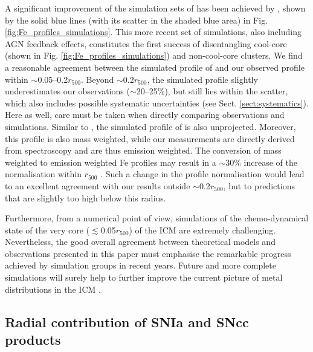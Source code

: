 \documentclass{aa}
\begin{document}
A significant improvement of the simulation sets of \citet[][]{2014MNRAS.438..195P} has been achieved by \citet[][]{2015ApJ...813L..17R}, shown by the solid blue lines (with its scatter in the shaded blue area) in Fig. \ref{fig:Fe_profiles_simulations}. This more recent set of simulations, also including AGN feedback effects, constitutes the first success of disentangling cool-core (shown in Fig. \ref{fig:Fe_profiles_simulations}) and non-cool-core clusters. We find a reasonable agreement between the simulated profile of \citet[][]{2015ApJ...813L..17R} and our observed profile within $\sim$0.05--0.2$r_{500}$. Beyond $\sim$0.2$r_{500}$, the simulated profile slightly underestimates our observations ($\sim$20--25\%), but still lies within the scatter, which also includes possible systematic uncertainties (see Sect. \ref{sect:systematics}). Here as well, care must be taken when directly comparing observations and simulations. Similar to \citet[][]{2014MNRAS.438..195P}, the simulated profile of \citet[][]{2015ApJ...813L..17R} is also unprojected. Moreover, this profile is also mass weighted, while our measurements are directly derived from spectroscopy and are thus emission weighted. The conversion of mass weighted to emission weighted Fe profiles may result in a $\sim$30\% increase of the normalisation within $r_{500}$ \citep[][]{2014MNRAS.438..195P}. Such a change in the profile normalisation would lead to an excellent agreement with our results outside $\sim$0.2$r_{500}$, but to predictions that are slightly too high below this radius.


Furthermore, from a numerical point of view, simulations of the chemo-dynamical state of the very core ($\lesssim$0.05$r_{500}$) of the ICM are extremely challenging. Nevertheless, the good overall agreement between theoretical models and observations presented in this paper must emphasise the remarkable progress achieved by simulation groups in recent years. Future and more complete simulations will surely help to further improve the current picture of metal distributions in the ICM \citep[e.g.][]{2017arXiv170108164B}.
















\subsection{Radial contribution of SNIa and SNcc products}\label{sect:discussion_SNe}
\end{document}
